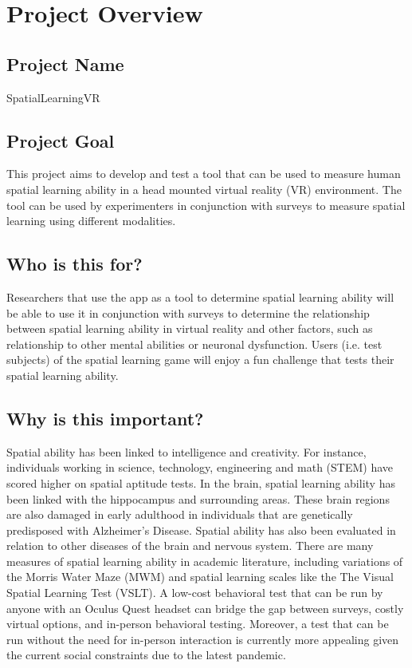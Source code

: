 \documentclass{report}
\begin{document}
\chapter*{Project Overview}

\section*{Project Name}
SpatialLearningVR

\section*{Project Goal}
This project aims to develop and test a tool that can be used to measure human spatial learning ability in a head mounted virtual reality (VR) environment. The tool can be used by experimenters in conjunction with surveys to measure spatial learning using different modalities.

\section*{Who is this for?}
Researchers that use the app as a tool to determine spatial learning ability will be able to use it in conjunction with surveys to determine the relationship between spatial learning ability in virtual reality and other factors, such as relationship to other mental abilities or neuronal dysfunction. Users (i.e. test subjects) of the spatial learning game will enjoy a fun challenge that tests their spatial learning ability.

\section*{Why is this important?}
Spatial ability has been linked to intelligence and creativity. For instance, individuals working in science, technology, engineering and math (STEM) have scored higher on spatial aptitude tests. In the brain, spatial learning ability has been linked with the hippocampus and surrounding areas. These brain regions are also damaged in early adulthood in individuals that are genetically predisposed with Alzheimer's Disease. Spatial ability has also been evaluated in relation to other diseases of the brain and nervous system. There are many measures of spatial learning ability in academic literature, including variations of the Morris Water Maze (MWM) and spatial learning scales like the The Visual Spatial Learning Test (VSLT). A low-cost behavioral test that can be run by anyone with an Oculus Quest headset can bridge the gap between surveys, costly virtual options, and in-person behavioral testing. Moreover, a test that can be run without the need for in-person interaction is currently more appealing given the current social constraints due to the latest pandemic.
\end{document}
